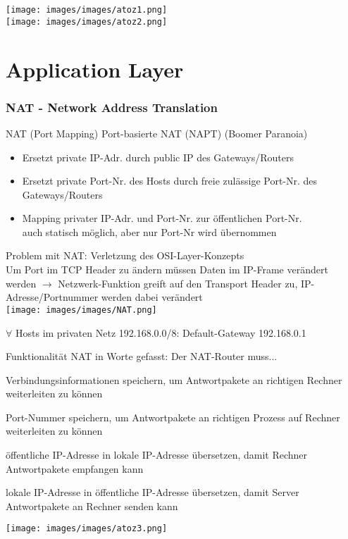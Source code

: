 \texttt{[image: images/images/atoz1.png]}\\
\texttt{[image: images/images/atoz2.png]}

\columnbreak

\section{Application Layer}

\subsubsection{NAT - Network Address Translation}

\begin{definition}{NAT (Port Mapping)} Port-basierte NAT (NAPT) {\tiny (Boomer Paranoia)}    
    \begin{itemize}
        \item Ersetzt private IP-Adr. durch public IP des Gateways/Routers
        \item Ersetzt private Port-Nr. des Hosts durch freie zulässige Port-Nr. des Gateways/Routers
        \item Mapping privater IP-Adr. und Port-Nr. zur öffentlichen Port-Nr.
                \\auch statisch möglich, aber nur Port-Nr wird übernommen
    \end{itemize}
    Problem mit NAT: Verletzung des OSI-Layer-Konzepts\\
    Um Port im TCP Header zu ändern müssen Daten im IP-Frame verändert werden 
    $\rightarrow$ Netzwerk-Funktion greift auf den Transport Header zu,
    IP-Adresse/Portnummer werden dabei verändert\\
        \texttt{[image: images/images/NAT.png]}
\end{definition}
\begin{remark}
    $\forall$ Hosts im privaten Netz 192.168.0.0/8: Default-Gateway 192.168.0.1
\end{remark}

\begin{remark} Funktionalität NAT in Worte gefasst:
    Der NAT-Router muss...

    Verbindungsinformationen speichern, um Antwortpakete an richtigen Rechner weiterleiten zu können

  Port-Nummer speichern, um Antwortpakete an richtigen Prozess auf Rechner weiterleiten zu können

  öffentliche IP-Adresse in lokale IP-Adresse übersetzen, damit Rechner Antwortpakete empfangen kann

  lokale IP-Adresse in öffentliche IP-Adresse übersetzen, damit Server Antwortpakete an Rechner senden kann
\end{remark}

\raggedbottom
\center
\texttt{[image: images/images/atoz3.png]}




